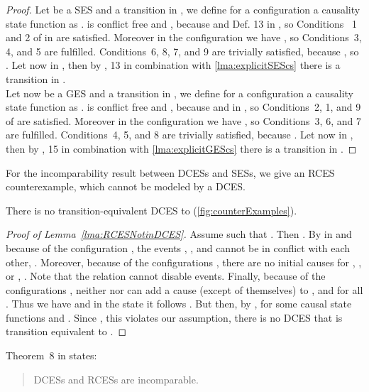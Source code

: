 \documentclass[runningheads,a4paper]{llncs}
\begin{document}
\begin{proof}
Let  be a SES and  a transition in , we define for a configuration  a causality state function  as . 
 is conflict free and , because  and Def. 13 in \cite{dynamicCausality15}, so Conditions~
1 and 2 of  in \cite{dynamicCausality15} are satisfied. Moreover in the configuration  we have , so Conditions~3, 4, and 5 are fulfilled. Conditions~6, 8, 7, and 9 are trivially satisfied, because , so .
Let now  in , then by , 13 in combination with \lem\ref{lma:explicitSEScs} there is a transition  in .\\
Let now  be a GES and  a transition in , we define for a configuration  a causality state function  as .  is conflict free and , because  and  in \cite{dynamicCausality15}, so Conditions~2, 1,  and 9 of  are satisfied. Moreover in the configuration  we have , so Conditions~3, 6, and 7 are fulfilled. Conditions~4, 5, and 8 are trivially satisfied, because .
Let now  in , then by , 15 in combination with \lem\ref{lma:explicitGEScs} there is a transition  in . 
\end{proof}

For the incomparability result between DCESs and SESs, we give an RCES
counterexample, which cannot be modeled by a DCES.

\begin{lemma}\label{lma:RCESNotinDCES}
There is no transition-equivalent DCES to  (\cf \fig\ref{fig:counterExamples}).
\end{lemma}

\begin{proof}[Proof of Lemma~\ref{lma:RCESNotinDCES}]
Assume  such that . Then .
	By  in \cite{dynamicCausality15} and because of the configuration , the events , , and  cannot be in conflict with each other, \ie .
	Moreover, because of the configurations , there are no initial causes for , , or , \ie . Note that the relation  cannot disable events.
	Finally, because of the configurations , neither  nor  can add a cause (except of themselves) to , \ie  and  for all .
	Thus we have  and in the state  it follows .
	But then, by ,  for some causal state functions  and .
	Since , this violates our assumption, \ie there is no DCES that is transition equivalent to .
\end{proof}

Theorem~8 in \cite{dynamicCausality15} states:
\begin{quote}
DCESs and RCESs are incomparable.
\end{quote}
\end{document}
